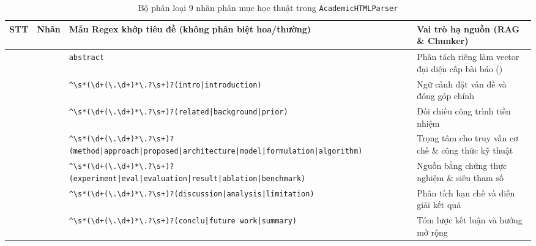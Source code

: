 \begin{table}[htbp]
  \centering
  \scriptsize
  \caption[Bộ phân loại chín nhãn phân mục học thuật trong AcademicHTMLParser]{Bộ phân loại 9 nhãn phân mục học thuật trong \texttt{AcademicHTMLParser}}
  \label{tab:ch2_section_types}
  \setlength{\tabcolsep}{3pt}
  \begin{tabularx}{\linewidth}{|>{\centering\arraybackslash}p{7mm}|>{\raggedright\arraybackslash}p{23mm}|>{\raggedright\arraybackslash}p{68mm}|L|}
    \hline
    \textbf{STT} & \textbf{Nhãn } & \textbf{Mẫu Regex khớp tiêu đề (không phân biệt hoa/thường)} & \textbf{Vai trò hạ nguồn (RAG \& Chunker)} \\
     &  & \texttt{abstract} & Phân tách riêng làm vector đại diện cấp bài báo () \\
     &  & \texttt{\^{}\textbackslash s*(\textbackslash d+(\textbackslash.\textbackslash d+)*\textbackslash.?\textbackslash s+)?\allowbreak(intro|\allowbreak introduction)} & Ngữ cảnh đặt vấn đề và đóng góp chính \\
     &  & \texttt{\^{}\textbackslash s*(\textbackslash d+(\textbackslash.\textbackslash d+)*\textbackslash.?\textbackslash s+)?\allowbreak(related|\allowbreak background|\allowbreak prior)} & Đối chiếu công trình tiền nhiệm \\
     &  & \texttt{\^{}\textbackslash s*(\textbackslash d+(\textbackslash.\textbackslash d+)*\textbackslash.?\textbackslash s+)?\allowbreak(method|\allowbreak approach|\allowbreak proposed|\allowbreak architecture|\allowbreak model|\allowbreak formulation|\allowbreak algorithm)} & Trọng tâm cho truy vấn cơ chế \& công thức kỹ thuật \\
     &  & \texttt{\^{}\textbackslash s*(\textbackslash d+(\textbackslash.\textbackslash d+)*\textbackslash.?\textbackslash s+)?\allowbreak(experiment|\allowbreak eval|\allowbreak evaluation|\allowbreak result|\allowbreak ablation|\allowbreak benchmark)} & Nguồn bằng chứng thực nghiệm \& siêu tham số \\
     &  & \texttt{\^{}\textbackslash s*(\textbackslash d+(\textbackslash.\textbackslash d+)*\textbackslash.?\textbackslash s+)?\allowbreak(discussion|\allowbreak analysis|\allowbreak limitation)} & Phân tích hạn chế và diễn giải kết quả \\
     &  & \texttt{\^{}\textbackslash s*(\textbackslash d+(\textbackslash.\textbackslash d+)*\textbackslash.?\textbackslash s+)?\allowbreak(conclu|\allowbreak future work|\allowbreak summary)} & Tóm lược kết luận và hướng mở rộng \\

\end{tabularx}
\end{table}
